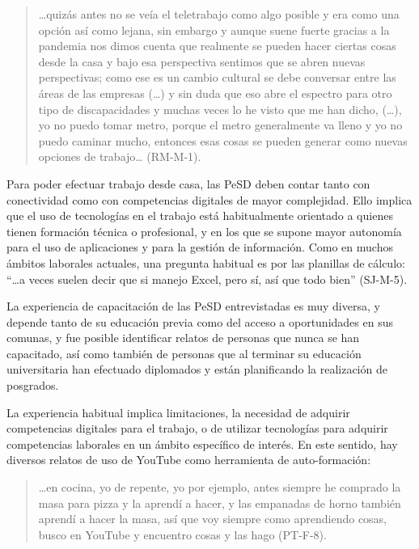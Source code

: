 \begin{quote}
	\ldots quizás antes no se veía el teletrabajo como algo posible y era como
	una opción así como lejana, sin embargo y aunque suene fuerte gracias a
	la pandemia nos dimos cuenta que realmente se pueden hacer ciertas cosas
	desde la casa y bajo esa perspectiva sentimos que se abren nuevas
	perspectivas; como ese es un cambio cultural se debe conversar entre las
	áreas de las empresas (\ldots) y sin duda que eso abre el espectro para
	otro tipo de discapacidades y muchas veces lo he visto que me han dicho,
	(\ldots), yo no puedo tomar metro, porque el metro generalmente va lleno
	y yo no puedo caminar mucho, entonces esas cosas se pueden generar como
	nuevas opciones de trabajo\ldots{} (RM-M-1).
\end{quote}

Para poder efectuar trabajo desde casa, las PeSD deben contar tanto con
conectividad como con competencias digitales de mayor complejidad. Ello
implica que el uso de tecnologías en el trabajo está habitualmente
orientado a quienes tienen formación técnica o profesional, y en los que
se supone mayor autonomía para el uso de aplicaciones y para la gestión
de información. Como en muchos ámbitos laborales actuales, una pregunta
habitual es por las planillas de cálculo: \enquote{\ldots a veces suelen decir que
	si manejo Excel, pero sí, así que todo bien} (SJ-M-5).

La experiencia de capacitación de las PeSD entrevistadas es muy diversa,
y depende tanto de su educación previa como del acceso a oportunidades
en sus comunas, y fue posible identificar relatos de personas que nunca
se han capacitado, así como también de personas que al terminar su
educación universitaria han efectuado diplomados y están planificando la
realización de posgrados.

La experiencia habitual implica limitaciones, la necesidad de adquirir
competencias digitales para el trabajo, o de utilizar tecnologías para
adquirir competencias laborales en un ámbito específico de interés. En
este sentido, hay diversos relatos de uso de YouTube como herramienta de
auto-formación:

\begin{quote}
	\ldots en cocina, yo de repente, yo por ejemplo, antes siempre he
	comprado la masa para pizza y la aprendí a hacer, y las empanadas de
	horno también aprendí a hacer la masa, así que voy siempre como
	aprendiendo cosas, busco en YouTube y encuentro cosas y las hago
	(PT-F-8).
\end{quote}

